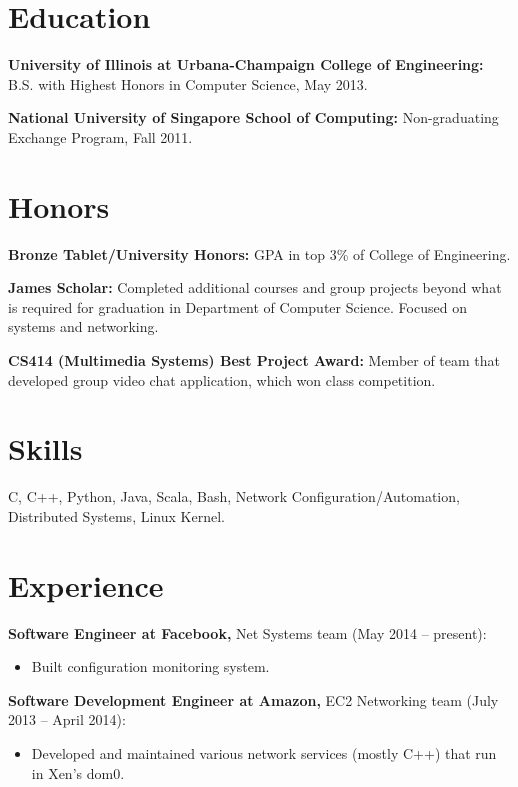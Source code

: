 \documentclass{res}
\begin{document}
\thispagestyle{empty} %

\begin{resume}
\section{Education}
\vspace{0.1in}

{\bf University of Illinois at Urbana-Champaign College of Engineering:} B.S. with Highest Honors in Computer Science, May 2013.

{\bf National University of Singapore School of Computing:} Non-graduating Exchange Program, Fall 2011.

\section{Honors}
\vspace{0.1in}

{\bf Bronze Tablet/University Honors:} GPA in top 3\% of College of Engineering.

{\bf James Scholar:} Completed additional courses and group projects beyond what is required for graduation in Department of
Computer Science. Focused on systems and networking.

{\bf CS414 (Multimedia Systems) Best Project Award:} Member of team that developed group video chat application, which won class competition.

\section{Skills}
\vspace{0.1in}
C,
C++,
Python,
Java,
Scala,
Bash,
Network Configuration/Automation,
Distributed Systems,
Linux Kernel.

\section{Experience}
\vspace{0.1in}
    {\bf Software Engineer at Facebook,} Net Systems team (May 2014 -- present):
    \begin{itemize}
        \item Built configuration monitoring system.
    \end{itemize}

    {\bf Software Development Engineer at Amazon,} EC2 Networking team (July 2013 -- April 2014):
    \begin{itemize}
        \item Developed and maintained various network services (mostly C++) that run in Xen's dom0.
    \end{itemize}


\end{resume}
\end{document}
